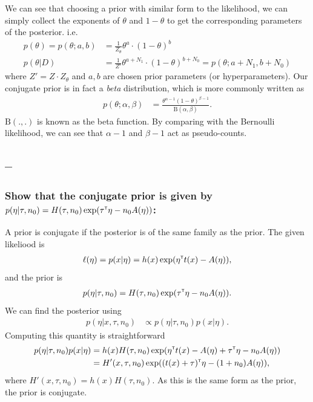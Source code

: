 \documentclass[a4paper]{article}
\newcommand{\questionref}[1]{\Cref{#1} -- \nameref{#1}}
\theoremstyle{definition}
\begin{document}
We can see that choosing a prior with similar form to the likelihood, we can simply collect the exponents of $\theta$ and $1 - \theta$ to get the corresponding parameters of the posterior. i.e.
\begin{align}
p( \theta ) = p( \theta ; a, b) &= \frac{ 1 }{ Z_\theta } \theta^{ a } \cdot( 1 - \theta )^{ b }\\
p( \theta | D ) &= \frac{ 1 }{ Z' } \theta^{ a + N_1 } \cdot( 1 - \theta )^{ b + N_0 } = p( \theta ; a + N_1, b + N_0 )
\end{align}
where $Z' = Z \cdot Z_\theta$ and $a, b$ are chosen prior parameters (or hyperparameters). Our conjugate prior is in fact a \textit{beta} distribution, which is more commonly written as
\begin{align}
p( \theta ; \alpha, \beta) &= \frac{ \theta ^ { \alpha - 1 } (1 - \theta ) ^ { \beta - 1} }{ \mathrm{ B }( \alpha, \beta )}.
\end{align}
$\mathrm{ B }( ., . )$ is known as the beta function. By comparing with the Bernoulli likelihood, we can see that $\alpha - 1$ and $\beta - 1$ act as pseudo-counts.

\subsection{\questionref{q:cp-exp-fam}}

\subsubsection{Show that the conjugate prior is given by $p(\eta|\tau, n_0) = H(\tau, n_0)\exp(\tau^\mathrm{\textsf{\tiny T}}\eta - n_0 A(\eta))$: }
A prior is conjugate if the posterior is of the same family as the prior.
The given likeliood is 
\begin{align}
\ell(\eta) = p(x|\eta) = h(x) \exp\left(\eta\transpose t(x) - A(\eta)\right),
\end{align}
and the prior is
\begin{align}
p(\eta|\tau, n_0) = H(\tau, n_0)\exp(\tau^\mathrm{\textsf{\tiny T}}\eta - n_0 A(\eta)).
\end{align}
We can find the posterior using
\begin{align}
p(\eta|x,\tau, n_0) &\propto p(\eta|\tau, n_0)p(x|\eta).
\end{align}
Computing this quantity is straightforward
\begin{align}
p(\eta|\tau, n_0)p(x|\eta) &= h(x)H(\tau, n_0) \exp\left(\eta\transpose t(x) - A(\eta) + \tau\transpose\eta - n_0 A(\eta) \right) \\
&= H'(x, \tau, n_0) \exp\left((t(x) + \tau)\transpose \eta - (1+n_0)A(\eta)\right), 
\end{align}
where $H'(x, \tau, n_0) = h(x)H(\tau, n_0)$.
As this is the same form as the prior, the prior is conjugate.
\end{document}

